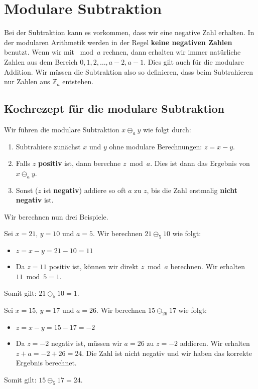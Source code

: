 \section{Modulare Subtraktion}

Bei der Subtraktion kann es vorkommen, dass wir eine negative Zahl erhalten. In der modularen Arithmetik werden in der Regel \textbf{keine negativen Zahlen} benutzt. Wenn wir mit $\bmod a$ rechnen, dann erhalten wir immer natürliche Zahlen aus dem Bereich $0, 1, 2, \dots, a-2, a-1$. Dies gilt auch für die modulare Addition. Wir müssen die Subtraktion also so definieren, dass beim Subtrahieren nur Zahlen aus $\mathbb{Z}_a$ entstehen.

\subsection{Kochrezept für die modulare Subtraktion}

Wir führen die modulare Subtraktion $x \ominus_a y$ wie folgt durch: 

\begin{enumerate}
\item Subtrahiere zunächst $x$ und $y$ ohne modulare Berechnungen: $z = x - y$.
\item Falls $z$ \textbf{positiv} ist, dann berechne $z \bmod a$. Dies ist dann das Ergebnis von $x \ominus_a y$.
\item Sonst ($z$ ist \textbf{negativ}) addiere so oft $a$ zu $z$, bis die Zahl erstmalig \textbf{nicht negativ} ist.
\end{enumerate}

Wir berechnen nun drei Beispiele.

\begin{example}
Sei $x = 21$, $y = 10$ und $a = 5$. Wir berechnen $21 \ominus_{5} 10$ wie folgt: 
\begin{itemize}
\item $z = x - y = 21 - 10 = 11$
\item Da $z = 11$ positiv ist, können wir direkt $z \bmod a$ berechnen. Wir erhalten $11 \bmod 5 = 1$.
\end{itemize}
Somit gilt: $21 \ominus_{5} 10 = 1$.
\end{example}

\begin{example}
Sei $x = 15$, $y = 17$ und $a = 26$. Wir berechnen $15 \ominus_{26} 17$ wie folgt:
\begin{itemize}
\item $z = x - y = 15 - 17 = -2$
\item Da $z = -2$ negativ ist, müssen wir $a = 26$ zu $z = -2$ addieren. Wir erhalten $z + a = -2 + 26 = 24$. Die Zahl ist nicht negativ und wir haben das korrekte Ergebnis berechnet.
\end{itemize}
Somit gilt: $15 \ominus_{5} 17 = 24$.
\end{example}

